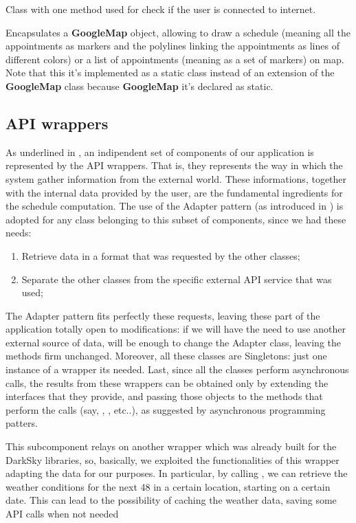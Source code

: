 Class with one method used for check if the user is connected to internet.

Encapsulates a \textbf{GoogleMap} object, allowing to draw a schedule (meaning all the appointments as markers and the polylines linking the appointments as lines of different colors) or a list of appointments (meaning as a set of markers) on map. Note that this it's implemented as a static class instead of an extension of the \textbf{GoogleMap} class because \textbf{GoogleMap} it's declared as static.

\subsection{API wrappers} \label{sect:APIWrappers}
As underlined in , an indipendent set of components of our application is represented by the API wrappers. That is, they represents the way in which the system gather information from the external world. These informations, together with the internal data provided by the user, are the fundamental ingredients for the schedule computation.
The use of the Adapter pattern (as introduced in ) is adopted for any class belonging to this subset of components, since we had these needs:

\begin{enumerate}
\item Retrieve data in a format that was requested by the other classes;
\item Separate the other classes from the specific external API service that was used;
\end{enumerate}

The Adapter pattern fits perfectly these requests, leaving these part of the application totally open to modifications: if we will have the need to use another external source of data, will be enough to change the Adapter class, leaving the methods firm unchanged.
Moreover, all these classes are Singletons: just one instance of a wrapper its needed.
Last, since all the classes perform asynchronous calls, the results from these wrappers can be obtained only by extending the interfaces that they provide, and passing those objects to the methods that perform the calls (say, , , etc..), as suggested by asynchronous programming patters.

This subcomponent relays on another wrapper which was already built for the DarkSky libraries, so, basically, we exploited the functionalities of this wrapper adapting the data for our purposes. In particular, by calling , we can retrieve the weather conditions for the next 48 in a certain location, starting on a certain date. This can lead to the possibility of caching the weather data, saving some API calls when not needed

